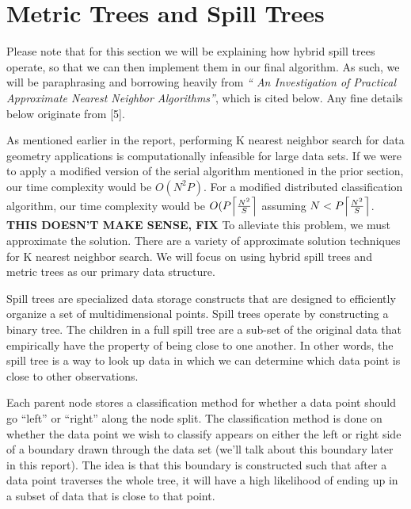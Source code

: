 \section{Metric Trees and Spill Trees}

\vspace{5 mm}
\noindent
Please note that for this section we will be explaining how hybrid spill 
trees operate, so that we can then implement them in our final algorithm. 
As such, we will be paraphrasing and borrowing heavily from  \textit{``
An Investigation of Practical Approximate Nearest Neighbor Algorithms''},
which is cited below.  Any fine details below originate from [5].

\vspace{5 mm}
\noindent
As mentioned earlier in the report, performing K nearest neighbor search for 
data geometry applications is computationally infeasible for large data sets. 
If we were to apply a modified version of the serial algorithm mentioned in the 
prior section, our time complexity would be $O(N^{2} P)$. For a modified 
distributed classification algorithm, our time complexity would be 
$O(P \ceil*{\frac{N^{2}}{S}}$ assuming $N < P \ceil*{\frac{N^{2}}{S}}$. 
\textbf{THIS DOESN'T MAKE SENSE, FIX}
To alleviate this problem, we must approximate the solution. There are a 
variety of approximate solution techniques for K nearest neighbor search. We 
will focus on using hybrid spill trees and metric trees as our primary data 
structure.

\vspace{5 mm}
\noindent
Spill trees are specialized data storage constructs that are designed to 
efficiently organize a set of multidimensional points.  Spill trees operate by 
constructing a binary tree. The children in a full spill tree are a sub-set of 
the original data that empirically have the property of being close to one 
another. In other words, the spill tree is a way to look up data in which we 
can determine which data point is close to other observations.

\vspace{5 mm}
\noindent
Each parent node stores a classification method for whether a data point should 
go ``left'' or ``right'' along the node split. The classification method is 
done on whether the data point we wish to classify appears on either the left 
or right side of a boundary drawn through the data set (we'll talk about this 
boundary later in this report). The idea is that this boundary is constructed 
such that after a data point traverses the whole tree, it will have a high 
likelihood of ending up in a subset of data that is close to that point.

